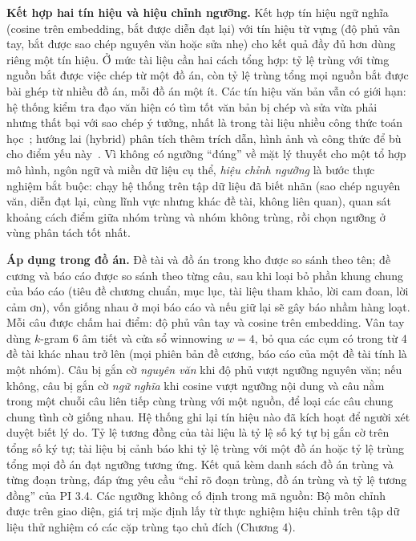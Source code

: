 \documentclass[../main.tex]{subfiles}
\begin{document}
\textbf{Kết hợp hai tín hiệu và hiệu chỉnh ngưỡng.} Kết hợp tín hiệu ngữ nghĩa (cosine trên embedding, bắt được diễn đạt lại) với tín hiệu từ vựng (độ phủ vân tay, bắt được sao chép nguyên văn hoặc sửa nhẹ) cho kết quả đầy đủ hơn dùng riêng một tín hiệu. Ở mức tài liệu cần hai cách tổng hợp: tỷ lệ trùng với từng nguồn bắt được việc chép từ một đồ án, còn tỷ lệ trùng tổng mọi nguồn bắt được bài ghép từ nhiều đồ án, mỗi đồ án một ít. Các tín hiệu văn bản vẫn có giới hạn: hệ thống kiểm tra đạo văn hiện có tìm tốt văn bản bị chép và sửa vừa phải nhưng thất bại với sao chép ý tưởng, nhất là trong tài liệu nhiều công thức toán học~\cite{satpute2024}; hướng lai (hybrid) phân tích thêm trích dẫn, hình ảnh và công thức để bù cho điểm yếu này~\cite{meuschke2017,meuschke2018}. Vì không có ngưỡng ``đúng'' về mặt lý thuyết cho một tổ hợp mô hình, ngôn ngữ và miền dữ liệu cụ thể, \textit{hiệu chỉnh ngưỡng} là bước thực nghiệm bắt buộc: chạy hệ thống trên tập dữ liệu đã biết nhãn (sao chép nguyên văn, diễn đạt lại, cùng lĩnh vực nhưng khác đề tài, không liên quan), quan sát khoảng cách điểm giữa nhóm trùng và nhóm không trùng, rồi chọn ngưỡng ở vùng phân tách tốt nhất.

\textbf{Áp dụng trong đồ án.} Đề tài và đồ án trong kho được so sánh theo tên; đề cương và báo cáo được so sánh theo từng câu, sau khi loại bỏ phần khung chung của báo cáo (tiêu đề chương chuẩn, mục lục, tài liệu tham khảo, lời cam đoan, lời cảm ơn), vốn giống nhau ở mọi báo cáo và nếu giữ lại sẽ gây báo nhầm hàng loạt. Mỗi câu được chấm hai điểm: độ phủ vân tay và cosine trên embedding. Vân tay dùng $k$-gram 6 âm tiết và cửa sổ winnowing $w = 4$, bỏ qua các cụm có trong từ 4 đề tài khác nhau trở lên (mọi phiên bản đề cương, báo cáo của một đề tài tính là một nhóm). Câu bị gắn cờ \textit{nguyên văn} khi độ phủ vượt ngưỡng nguyên văn; nếu không, câu bị gắn cờ \textit{ngữ nghĩa} khi cosine vượt ngưỡng nội dung và câu nằm trong một chuỗi câu liên tiếp cùng trùng với một nguồn, để loại các câu chung chung tình cờ giống nhau. Hệ thống ghi lại tín hiệu nào đã kích hoạt để người xét duyệt biết lý do. Tỷ lệ tương đồng của tài liệu là tỷ lệ số ký tự bị gắn cờ trên tổng số ký tự; tài liệu bị cảnh báo khi tỷ lệ trùng với một đồ án hoặc tỷ lệ trùng tổng mọi đồ án đạt ngưỡng tương ứng. Kết quả kèm danh sách đồ án trùng và từng đoạn trùng, đáp ứng yêu cầu ``chỉ rõ đoạn trùng, đồ án trùng và tỷ lệ tương đồng'' của PI 3.4. Các ngưỡng không cố định trong mã nguồn: Bộ môn chỉnh được trên giao diện, giá trị mặc định lấy từ thực nghiệm hiệu chỉnh trên tập dữ liệu thử nghiệm có các cặp trùng tạo chủ đích (Chương 4).
\end{document}
